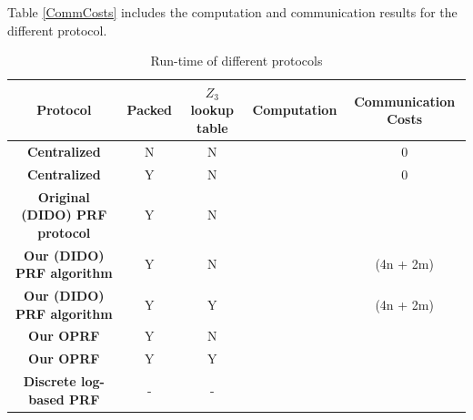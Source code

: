 Table \ref{CommCosts} includes the computation and communication results for the different protocol.


\begin{table}[htbp]
	\label{CommCosts}
	\begin{center}
		\begin{tabular}{|c|c|c|c|c|}
			\hline
			\textbf{Protocol} & \textbf{Packed }  &  \textbf{$Z_3$ lookup table} & \textbf{Computation} & Communication Costs \\
			\hline
			\hline
			\textbf{Centralized}  & N  & N  &  & 0	 \\
			\hline
			\textbf{Centralized} & Y  &  N & & 0 \\
			\hline
			\textbf{Original (DIDO) PRF protocol} & Y	& N &   & 	\\
			\hline
			\textbf{Our  (DIDO) PRF algorithm} & Y & N &	 & (4n + 2m) \\
			\hline
			\textbf{Our  (DIDO) PRF algorithm} & Y & Y &  &  (4n + 2m)	\\
			\hline
			\textbf{Our OPRF} & Y & N &  &  	\\
			\hline
			\textbf{Our OPRF} & Y & Y &  &  	\\
			\hline
			\textbf{Discrete log-based PRF} &  - & - &  &  \\
			\hline
			
		\end{tabular}
		
		\vspace{-1mm}
		\caption{Run-time of different protocols}
		\label{RuntimeTable}
	\end{center}
	\vspace{-5mm}
\end{table}


